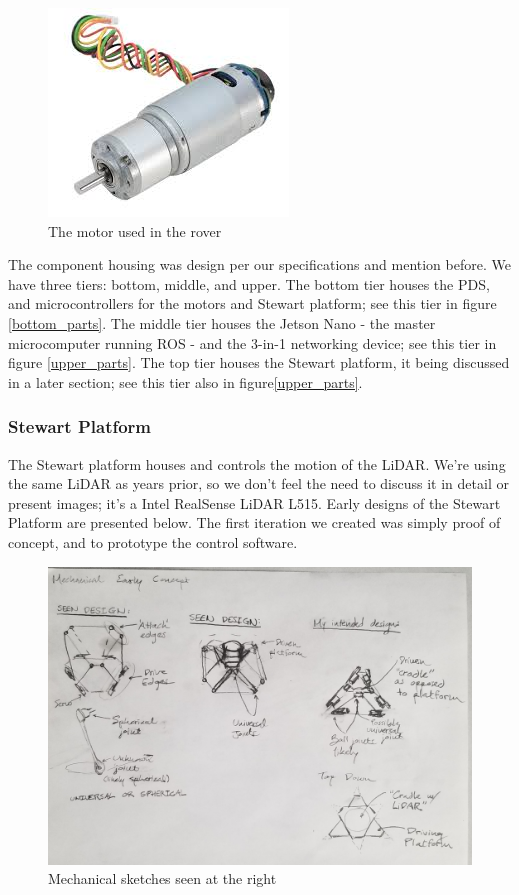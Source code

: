 \documentclass[a4paper, 10pt]{article}
\begin{document}
		\begin{figure} [h]
			\centering
			\includegraphics[scale=1]{Photos/Gear motor 12V planetary}
			\caption{The motor used in the rover}
			\label{motors}
		\end{figure}
		
		The component housing was design per our specifications and mention before. We have three tiers: bottom, middle, and upper. The bottom tier houses the PDS, and microcontrollers for the motors and Stewart platform; see this tier in figure \ref{bottom_parts}. The middle tier houses the Jetson Nano - the master microcomputer running ROS - and the 3-in-1 networking device; see this tier in figure \ref{upper_parts}. The top tier houses the Stewart platform, it being discussed in a later section; see this tier also in figure\ref{upper_parts}.
		
 		\subsubsection*{Stewart Platform}
 		The Stewart platform houses and controls the motion of the LiDAR. We're using the same LiDAR as years prior, so we don't feel the need to discuss it in detail or present images; it's a Intel RealSense LiDAR L515. Early designs of the Stewart Platform are presented below. The first iteration we created was simply proof of concept, and to prototype the control software.
 		
 		\begin{figure} [h]
			\centering
			\includegraphics[scale=0.2]{Photos/early_mechanical}
			\caption{Mechanical sketches seen at the right}
			\label{basic_mechanical}
		\end{figure}
		
\end{document}
